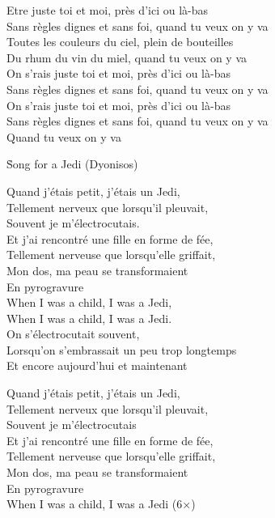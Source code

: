 \documentclass{novel}
\begin{document}
{\begin{minipage}[t][0.5\textheight][t]{\textwidth}
\begin{multicols}{2}
Etre juste toi et moi, près d'ici ou là-bas \\
Sans règles dignes et sans foi, quand tu veux on y va \\
Toutes les couleurs du ciel, plein de bouteilles \\
Du rhum du vin du miel, quand tu veux on y va \\

On s'rais juste toi et moi, près d'ici ou là-bas \\
Sans règles dignes et sans foi, quand tu veux on y va \\

On s'rais juste toi et moi, près d'ici ou là-bas \\
Sans règles dignes et sans foi, quand tu veux on y va \\

Quand tu veux on y va
\end{multicols}
\end{minipage}

\begin{minipage}[t][0.5\textheight][t]{\textwidth}
\vspace{0.00\textheight}
\h*{Song for a Jedi (Dyonisos)}
\begin{multicols}{2}
Quand j'étais petit, j'étais un Jedi, \\
Tellement nerveux que lorsqu'il pleuvait, \\
Souvent je m'électrocutais. \\

Et j'ai rencontré une fille en forme de fée, \\
Tellement nerveuse que lorsqu'elle griffait, \\
Mon dos, ma peau se transformaient \\
En pyrogravure \\

When I was a child, I was a Jedi, \\
When I was a child, I was a Jedi. \\

On s'électrocutait souvent, \\
Lorsqu'on s'embrassait un peu trop longtemps \\
Et encore aujourd'hui et maintenant \\

\columnbreak

Quand j'étais petit, j'étais un Jedi, \\
Tellement nerveux que lorsqu'il pleuvait, \\
Souvent je m'électrocutais \\

Et j'ai rencontré une fille en forme de fée, \\
Tellement nerveuse que lorsqu'elle griffait, \\
Mon dos, ma peau se transformaient \\
En pyrogravure \\

When I was a child, I was a Jedi (6×)
\end{multicols}
\end{minipage}

}
\end{document}
